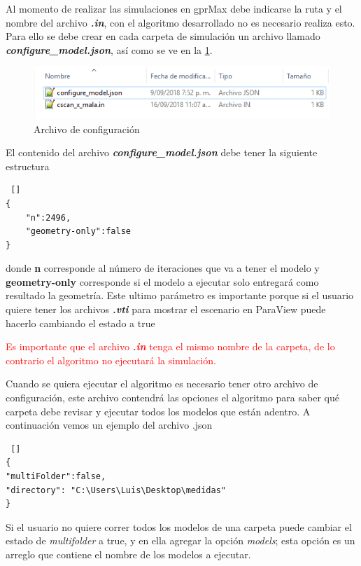 Al momento de realizar las simulaciones en gprMax debe indicarse la ruta y el nombre del archivo \textbf{\textit{.in}}, con el algoritmo desarrollado no es necesario realiza esto. Para ello se debe crear en cada carpeta de simulación un archivo llamado \textbf{\textit{configure\_model.json}}, así como se ve en la \figurename{ \ref{fig:config_file}}.  
 
\begin{figure}[H]
\centering
\includegraphics[width=15cm,keepaspectratio]{chapter1/images/archivos_modelo.png}
\caption{Archivo de configuración}
\label{fig:config_file}
\end{figure}

El contenido del archivo \textbf{\textit{configure\_model.json}}  debe tener la siguiente estructura 
\begin{lstlisting} []
{
    "n":2496, 
    "geometry-only":false
}
\end{lstlisting}
donde \textbf{n} corresponde al número de iteraciones que va a tener el modelo y \textbf{geometry-only} corresponde si el modelo a ejecutar solo entregará como resultado la geometría. Este ultimo parámetro es importante porque si el usuario quiere tener los archivos \textbf{\textit{.vti}} para mostrar el escenario en ParaView puede hacerlo cambiando el estado a true

\textcolor{red}{Es importante que el archivo \textbf{\textit{.in }} tenga el mismo nombre de la carpeta, de lo contrario el algoritmo no ejecutará la simulación.}

Cuando se quiera ejecutar el algoritmo es necesario tener otro archivo de configuración, este archivo contendrá las opciones el algoritmo para saber qué carpeta debe revisar y ejecutar todos los modelos que están adentro. A continuación vemos un ejemplo del archivo .json

\begin{lstlisting} []
{
"multiFolder":false,
"directory": "C:\Users\Luis\Desktop\medidas"
}
\end{lstlisting}

Si el usuario no quiere correr todos los modelos de una carpeta puede cambiar el estado de \textit{multifolder} a true, y en ella agregar la opción \textit{models}; esta opción es un arreglo que contiene el nombre de los modelos a ejecutar.

